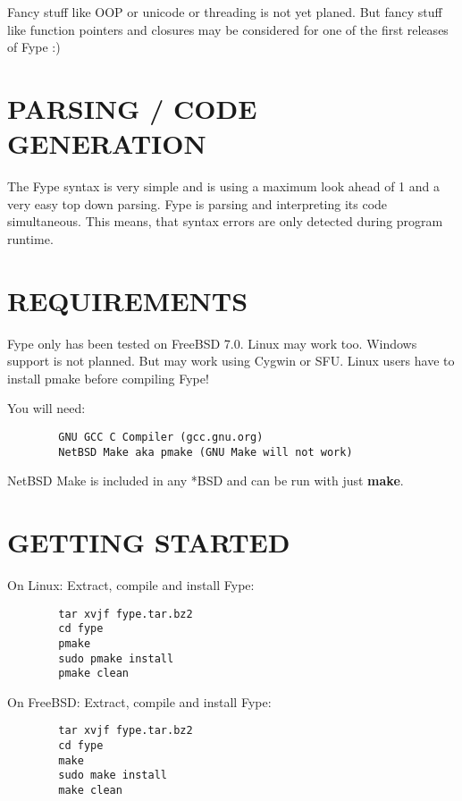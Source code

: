 Fancy stuff like OOP or unicode or threading is not yet planed. But fancy stuff like function pointers and closures may be considered for one of the first releases of Fype :)

\section{PARSING / CODE GENERATION\label{PARSING_CODE_GENERATION}}


The Fype syntax is very simple and is using a maximum look ahead of 1 and a very easy top down parsing. Fype is parsing and interpreting its code simultaneous. This means, that syntax errors are only detected during program runtime.

\section{REQUIREMENTS\label{REQUIREMENTS}}


Fype only has been tested on FreeBSD 7.0. Linux may work too. Windows support is not planned. But may work using Cygwin or SFU. Linux users have to install pmake before compiling Fype!



You will need:

\begin{verbatim}
        GNU GCC C Compiler (gcc.gnu.org)
        NetBSD Make aka pmake (GNU Make will not work)
\end{verbatim}


NetBSD Make is included in any *BSD and can be run with just \textbf{make}.

\section{GETTING STARTED\label{GETTING_STARTED}}


On Linux: Extract, compile and install Fype:

\begin{verbatim}
        tar xvjf fype.tar.bz2
        cd fype
        pmake
        sudo pmake install 
        pmake clean
\end{verbatim}


On FreeBSD: Extract, compile and install Fype:

\begin{verbatim}
        tar xvjf fype.tar.bz2
        cd fype
        make
        sudo make install 
        make clean
\end{verbatim}


